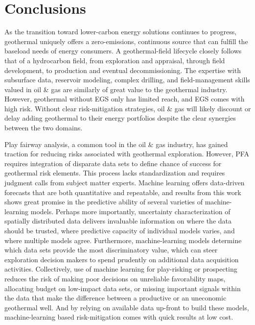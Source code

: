 \chapter{Conclusions}\label{ch8:conclusions}

As the transition toward lower-carbon energy solutions continues to progress, geothermal uniquely offers a zero-emissions, continuous source that can fulfill the baseload needs of energy consumers. A geothermal-field lifecycle closely follows that of a hydrocarbon field, from exploration and appraisal, through field development, to production and eventual decommissioning. The expertise with subsurface data, reservoir modeling, complex drilling, and field-management skills valued in oil \& gas are similarly of great value to the geothermal industry. However, geothermal without EGS only has limited reach, and EGS comes with high risk. Without clear risk-mitigation strategies, oil \& gas will likely discount or delay adding geothermal to their energy portfolios despite the clear synergies between the two domains.

Play fairway analysis, a common tool in the oil \& gas industry, has gained traction for reducing risks associated with geothermal exploration. However, PFA requires integration of disparate data sets to define chance of success for geothermal risk elements. This process lacks standardization and requires judgment calls from subject matter experts. Machine learning offers data-driven forecasts that are both quantitative and repeatable, and results from this work shows great promise in the predictive ability of several varieties of machine-learning models. Perhaps more importantly, uncertainty characterization of spatially distributed data delivers invaluable information on where the data should be trusted, where predictive capacity of individual models varies, and where multiple models agree. Furthermore, machine-learning models determine which data sets provide the most discriminatory value, which can steer exploration decision makers to spend prudently on additional data acquisition activities. Collectively, use of machine learning for play-risking or prospecting reduces the risk of making poor decisions on unreliable favorability maps, allocating budget on low-impact data sets, or missing important signals within the data that make the difference between a productive or an uneconomic geothermal well. And by relying on available data up-front to build these models, machine-learning based risk-mitigation comes with quick results at low cost.

